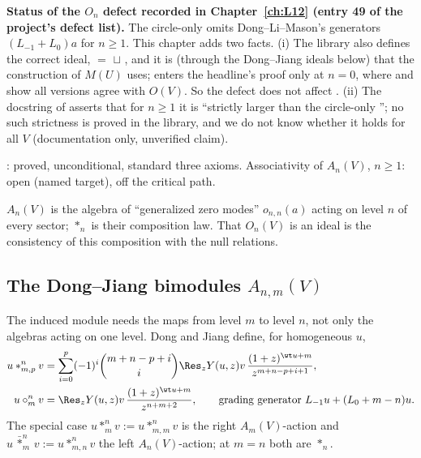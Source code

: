 \begin{warning}
\textbf{Status of the $O_n$ defect recorded in Chapter~\ref{ch:L12} (entry 49 of the project's defect list).} The circle-only
 omits Dong--Li--Mason's generators $(L_{-1}+L_0)a$ for $n\ge1$. This chapter adds two facts. (i) The library also
defines the correct ideal,  $=$  $\sqcup$ , and it is  (through the Dong--Jiang
ideals below) that the construction of $M(U)$ uses;  enters the headline's proof only at $n = 0$, where
 and  show all versions agree with $O(V)$. So the defect does not affect
. (ii) The docstring of  asserts that for $n\ge1$ it is ``strictly larger than the circle-only
''; no such strictness is proved in the library, and we do not know whether it holds for all $V$ (documentation only, unverified
claim).
\end{warning}

\begin{status}
: proved, unconditional, standard three axioms. Associativity of $A_n(V)$, $n\ge1$: open (named
target), off the critical path.
\end{status}

\begin{physics}
$A_n(V)$ is the algebra of ``generalized zero modes'' $o_{n,n}(a)$ acting on level $n$ of every sector; $*_n$ is their
composition law. That $O_n(V)$ is an ideal is the consistency of this composition with the null relations.
\end{physics}

\subsection{The Dong--Jiang bimodules \texorpdfstring{$A_{n,m}(V)$}{A\_\{n,m\}(V)}}

The induced module needs the maps from level $m$ to level $n$, not only the algebras acting on one level. Dong and Jiang
define, for homogeneous $u$,
\begin{align}
 u*^n_{m,p}v &= \sum_{i=0}^{p}(-1)^i\binom{m+n-p+i}{i}\Res_zY(u,z)v\,\frac{(1+z)^{\wt u+m}}{z^{m+n-p+i+1}},\label{l13:eq:djprod}\\
 u\circ^n_mv &= \Res_zY(u,z)v\,\frac{(1+z)^{\wt u+m}}{z^{n+m+2}},\qquad
 \text{grading generator } L_{-1}u+(L_0+m-n)u.\notag
\end{align}
The special case $u*^n_mv := u*^n_{m,m}v$ is the right $A_m(V)$-action and $u\,\bar*^n_m\,v := u*^n_{m,n}v$ the left $A_n(V)$-action;
at $m = n$ both are $*_n$.

